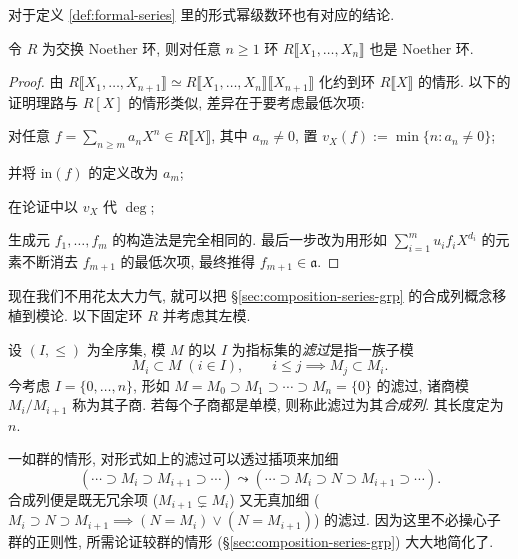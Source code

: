对于定义 \ref{def:formal-series} 里的形式幂级数环也有对应的结论.
\begin{theorem}
	令 $R$ 为交换 Noether 环, 则对任意 $n \geq 1$ 环 $R\llbracket X_1, \ldots, X_n \rrbracket$ 也是 Noether 环.
\end{theorem}
\begin{proof}
	由 $R \llbracket X_1, \ldots, X_{n+1}\rrbracket \simeq R \llbracket X_1, \ldots, X_n \rrbracket \llbracket X_{n+1}\rrbracket$ 化约到环 $R \llbracket X \rrbracket$ 的情形. 以下的证明理路与 $R[X]$ 的情形类似, 差异在于要考虑最低次项:
	\begin{compactitem}
		\item 对任意 $f = \sum_{n \geq m} a_n X^n \in R\llbracket X \rrbracket$, 其中 $a_m \neq 0$, 置 $v_X(f) := \min\{n: a_n \neq 0\}$;
		\item 并将 $\text{in}(f)$ 的定义改为 $a_m$;
		\item 在论证中以 $v_X$ 代 $\deg$;
	\end{compactitem}
	生成元 $f_1, \ldots, f_m$ 的构造法是完全相同的. 最后一步改为用形如 $\sum_{i=1}^m u_i f_i X^{d_i}$ 的元素不断消去 $f_{m+1}$ 的最低次项, 最终推得 $f_{m+1} \in \mathfrak{a}$.
\end{proof}

现在我们不用花太大力气, 就可以把 \S\ref{sec:composition-series-grp} 的合成列概念移植到模论. 以下固定环 $R$ 并考虑其左模.
\begin{definition}
	设 $(I, \leq)$ 为全序集, 模 $M$ 的以 $I$ 为指标集的\emph{滤过}是指一族子模
	\[ M_i \subset M\; (i \in I), \qquad i \leq j \implies M_j \subset M_i. \]
	今考虑 $I = \{0, \ldots, n\}$, 形如 $M = M_0 \supset M_1 \supset \cdots \supset M_n = \{0\}$ 的滤过, 诸商模 $M_i/M_{i+1}$ 称为其子商. 若每个子商都是单模, 则称此滤过为其\emph{合成列}. 其长度定为 $n$.
\end{definition}
一如群的情形, 对形式如上的滤过可以透过插项来加细
\[ (\cdots \supset M_i \supset M_{i+1} \supset \cdots) \leadsto (\cdots \supset M_i \supset N \supset M_{i+1} \supset \cdots). \]
合成列便是既无冗余项 ($M_{i+1} \subsetneq M_i$) 又无真加细 ($M_i \supset N \supset M_{i+1} \implies (N=M_i) \vee (N=M_{i+1})$) 的滤过. 因为这里不必操心子群的正则性, 所需论证较群的情形 (\S\ref{sec:composition-series-grp}) 大大地简化了.

